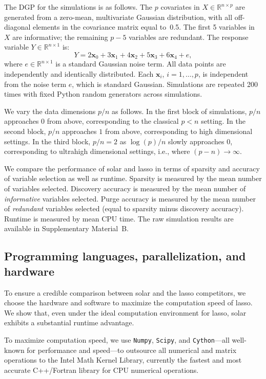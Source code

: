 \documentclass[11pt,review,authoryear]{elsarticle}
\begin{document}
The DGP for the simulations is as follows. The $p$ covariates in $X \in \mathbb{R}^{n \times p}$ are generated from a zero-mean, multivariate Gaussian distribution, with all off-diagonal elements in the covariance matrix equal to~0.5. The first 5 variables in $X$ are informative; the remaining $p-5$ variables are redundant. The response variable $Y \in \mathbb{R}^{n \times 1}$ is:
%
\begin{equation}
%
  Y =  2 \mathbf{x}_0 + 3 \mathbf{x}_1 + 4 \mathbf{x}_2 + 5 \mathbf{x}_3 + 6 \mathbf{x}_4  + e,
  \label{eqn:pop_model}
\end{equation}
%
where $e\in \mathbb{R}^{n \times 1}$ is a standard Gaussian noise term. All data points are independently and identically distributed. Each $\mathbf{x}_i$, $i=1,\ldots,p$, is independent from the noise term $e$, which is standard Gaussian. Simulations are repeated 200 times with fixed Python random generators across simulations.

We vary the data dimensions $p/n$ as follows. In the first block of simulations, $p/n$ approaches $0$ from above, corresponding to the classical $p<n$ setting. In the second block, $p/n$ approaches $1$ from above, corresponding to high dimensional settings. In the third block, $p/n=2$ as $\log(p)/n$ slowly approaches $0$, corresponding to ultrahigh dimensional settings, i.e., where $(p-n)\rightarrow\infty$.

We compare the performance of solar and lasso in terms of sparsity and accuracy of variable selection as well as runtime. Sparsity is measured by the mean number of variables selected. Discovery accuracy is measured by the mean number of \emph{informative} variables selected. Purge accuracy is measured by the mean number of \emph{redundant} variables selected (equal to sparsity minus discovery accuracy). Runtime is measured by mean CPU time.  The raw simulation results are available in Supplementary Material~B.

\subsection{Programming languages, parallelization, and hardware}

To ensure a credible comparison between solar and the lasso competitors, we choose the hardware and software to maximize the computation speed of lasso. We show that, even under the ideal computation environment for lasso, solar exhibits a substantial runtime advantage.

To maximize computation speed, we use \texttt{Numpy}, \texttt{Scipy}, and \texttt{Cython}---all well-known for performance and speed---to outsource all numerical and matrix operations to the Intel Math Kernel Library, currently the fastest and most accurate C++/Fortran library for CPU numerical operations.
\end{document}
